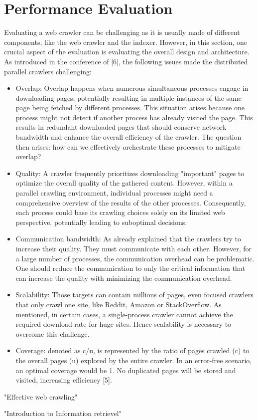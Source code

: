 \section{Performance Evaluation}
Evaluating a web crawler can be challenging as it is usually made of different components, like the web crawler and the indexer. However, in this section, one crucial aspect of the evaluation is evaluating the overall design and architecture. As introduced in the conference of [6], the following issues made the distributed parallel crawlers challenging:   

\begin{itemize}
  \item Overlap: Overlap happens when numerous simultaneous processes engage in downloading pages, potentially resulting in multiple instances of the same page being fetched by different processes. This situation arises because one process might not detect if another process has already visited the page. This results in redundant downloaded pages that should conserve network bandwidth and enhance the overall efficiency of the crawler. The question then arises: how can we effectively orchestrate these processes to mitigate overlap?
  \item Quality: A crawler frequently prioritizes downloading "important" pages to optimize the overall quality of the gathered content. However, within a parallel crawling environment, individual processes might need a comprehensive overview of the results of the other processes. Consequently, each process could base its crawling choices solely on its limited web perspective, potentially leading to suboptimal decisions.
  \item Communication bandwidth: As already explained that the crawlers try to increase their quality. They must communicate with each other. However, for a large number of processes, the communication overhead can be problematic. One should reduce the communication to only the critical information that can increase the quality with minimizing the communication overhead. 
  \item Scalability: Those targets can contain millions of pages, even focused crawlers that only crawl one site, like Reddit, Amazon or StackOverflow. As mentioned, in certain cases, a single-process crawler cannot achieve the required download rate for huge sites. Hence scalability is necessary to overcome this challenge.
  \item Coverage: denoted as c/u, is represented by the ratio of pages crawled (c) to the overall pages (u) explored by the entire crawler. In an error-free scenario, an optimal coverage would be 1. No duplicated pages will be stored and visited, increasing efficiency [5].
\end{itemize}

"Effective web crawling"

"Introduction to Information retrievel"
